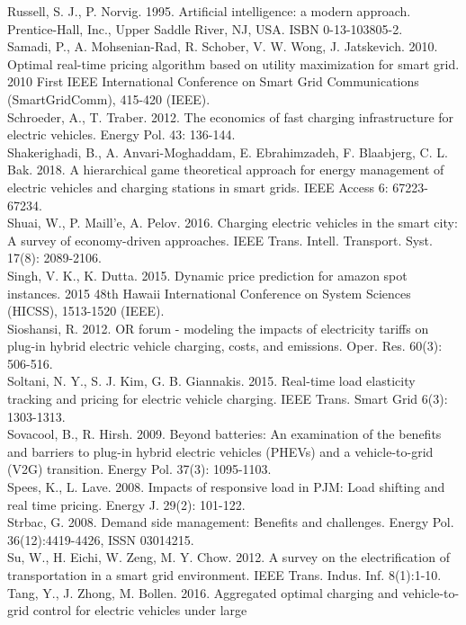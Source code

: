 \documentclass[10pt]{article}
\begin{document}
Russell, S. J., P. Norvig. 1995. Artificial intelligence: a modern approach. Prentice-Hall, Inc., Upper Saddle River, NJ, USA. ISBN 0-13-103805-2.\\
Samadi, P., A. Mohsenian-Rad, R. Schober, V. W. Wong, J. Jatskevich. 2010. Optimal real-time pricing algorithm based on utility maximization for smart grid. 2010 First IEEE International Conference on Smart Grid Communications (SmartGridComm), 415-420 (IEEE).\\
Schroeder, A., T. Traber. 2012. The economics of fast charging infrastructure for electric vehicles. Energy Pol. 43: 136-144.\\
Shakerighadi, B., A. Anvari-Moghaddam, E. Ebrahimzadeh, F. Blaabjerg, C. L. Bak. 2018. A hierarchical game theoretical approach for energy management of electric vehicles and charging stations in smart grids. IEEE Access 6: 67223-67234.\\
Shuai, W., P. Maill'e, A. Pelov. 2016. Charging electric vehicles in the smart city: A survey of economy-driven approaches. IEEE Trans. Intell. Transport. Syst. 17(8): 2089-2106.\\
Singh, V. K., K. Dutta. 2015. Dynamic price prediction for amazon spot instances. 2015 48th Hawaii International Conference on System Sciences (HICSS), 1513-1520 (IEEE).\\
Sioshansi, R. 2012. OR forum - modeling the impacts of electricity tariffs on plug-in hybrid electric vehicle charging, costs, and emissions. Oper. Res. 60(3): 506-516.\\
Soltani, N. Y., S. J. Kim, G. B. Giannakis. 2015. Real-time load elasticity tracking and pricing for electric vehicle charging. IEEE Trans. Smart Grid 6(3): 1303-1313.\\
Sovacool, B., R. Hirsh. 2009. Beyond batteries: An examination of the benefits and barriers to plug-in hybrid electric vehicles (PHEVs) and a vehicle-to-grid (V2G) transition. Energy Pol. 37(3): 1095-1103.\\
Spees, K., L. Lave. 2008. Impacts of responsive load in PJM: Load shifting and real time pricing. Energy J. 29(2): 101-122.\\
Strbac, G. 2008. Demand side management: Benefits and challenges. Energy Pol. 36(12):4419-4426, ISSN 03014215.\\
Su, W., H. Eichi, W. Zeng, M. Y. Chow. 2012. A survey on the electrification of transportation in a smart grid environment. IEEE Trans. Indus. Inf. 8(1):1-10.\\
Tang, Y., J. Zhong, M. Bollen. 2016. Aggregated optimal charging and vehicle-to-grid control for electric vehicles under large\\
\end{document}
